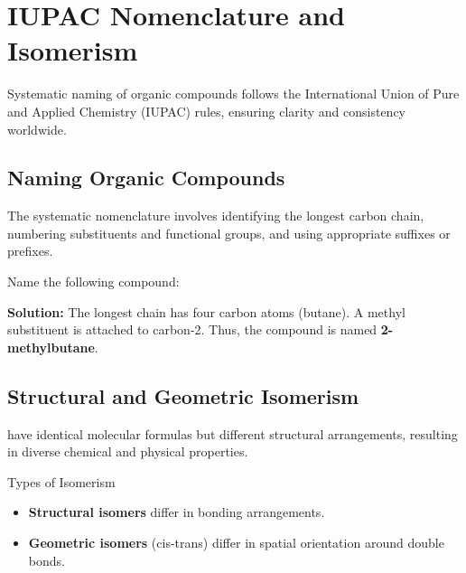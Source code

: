 \FloatBarrier

\section{IUPAC Nomenclature and Isomerism}
\FloatBarrier
\FloatBarrier
\FloatBarrier

Systematic naming of organic compounds follows the International Union of Pure and Applied Chemistry (IUPAC) rules, ensuring clarity and consistency worldwide.

\subsection{Naming Organic Compounds}
\FloatBarrier
\FloatBarrier
\FloatBarrier

The systematic nomenclature involves identifying the longest carbon chain, numbering substituents and functional groups, and using appropriate suffixes or prefixes.

\begin{example}
Name the following compound: 

\textbf{Solution:} The longest chain has four carbon atoms (butane). A methyl substituent is attached to carbon-2. Thus, the compound is named \textbf{2-methylbutane}.
\end{example}


\subsection{Structural and Geometric Isomerism}
\FloatBarrier
\FloatBarrier
\FloatBarrier

 have identical molecular formulas but different structural arrangements, resulting in diverse chemical and physical properties.

\begin{keyconcept}{Types of Isomerism}
\begin{itemize}
    \item \textbf{Structural isomers} differ in bonding arrangements.
    \item \textbf{Geometric isomers} (cis-trans) differ in spatial orientation around double bonds.
\end{itemize}
\end{keyconcept}

